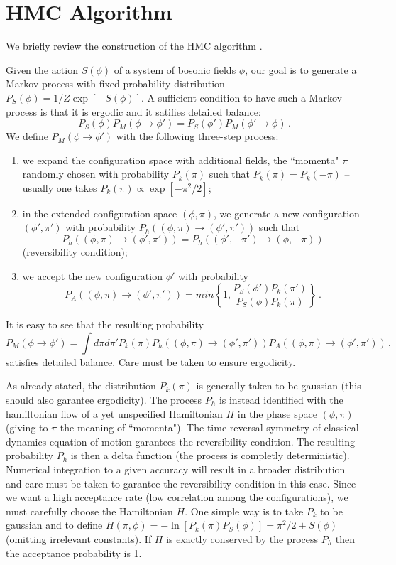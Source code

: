 \documentclass{article}[12pt]
\begin{document}
\section{HMC Algorithm}

We briefly review the construction of the HMC algorithm \cite{??}.

Given the action $S(\phi)$ of a system of bosonic fields $\phi$, our goal is to generate a Markov process with
fixed probability distribution $P_S(\phi) = 1/Z \exp[-S(\phi) ]$. A sufficient condition to have such a
Markov process is that it is ergodic and it satifies detailed balance:
\begin{equation}
P_S(\phi)P_M(\phi\rightarrow \phi') = P_S(\phi')P_M(\phi' \rightarrow \phi) \, .
\end{equation}
We define $P_M(\phi \rightarrow \phi')$ with the following three-step process:
\begin{enumerate}
\item we expand the configuration space with additional fields, the ``momenta" $\pi$ randomly chosen with probability
$P_k(\pi)$ such that $P_k(\pi)=P_k(-\pi)$ -- usually one takes $P_k(\pi)\propto \exp[-\pi^2/2]$;
\item in the extended configuration space $(\phi, \pi)$, we generate a new configuration $(\phi',\pi')$ with probability
$P_h((\phi,\pi)\rightarrow(\phi',\pi'))$ such that
\[P_h((\phi,\pi)\rightarrow(\phi',\pi')) = P_h((\phi',-\pi')\rightarrow(\phi,-\pi))\]
(reversibility condition);
\item we accept the new configuration $\phi'$ with probability
\[P_A((\phi,\pi)\rightarrow(\phi',\pi')) = min \left\{ 1, \frac{P_S(\phi')P_k(\pi')}{P_S(\phi)P_k(\pi)} \right\} \, .\]
\end{enumerate}
It is easy to see that the resulting probability
\begin{equation}
P_M(\phi\rightarrow\phi') = \int d\pi d\pi' P_k(\pi) P_h((\phi,\pi)\rightarrow(\phi',\pi')) P_A((\phi,\pi)\rightarrow(\phi',\pi')) \, ,
\end{equation}
satisfies detailed balance. Care must be taken to ensure ergodicity.

As already stated, the distribution $P_k(\pi)$ is generally taken to be gaussian (this should also garantee ergodicity).
The process $P_h$ is instead identified with the hamiltonian flow of a yet unspecified Hamiltonian $H$ in the phase
space $(\phi,\pi)$ (giving to $\pi$ the meaning of ``momenta"). The time reversal symmetry of classical dynamics equation of motion
garantees the reversibility condition. The resulting probability $P_h$ is then a delta function (the process is completly deterministic).
Numerical integration to a given accuracy will result in a broader distribution and care must be taken to garantee the reversibility condition
in this case.
Since we want a high acceptance rate (low correlation among the configurations), we must carefully choose the Hamiltonian $H$.
One simple way is to take $P_k$ to be gaussian and to define $H(\pi,\phi)=-\ln [P_k(\pi) P_S(\phi)] = \pi^2/2 + S(\phi)$
(omitting irrelevant constants). If $H$ is exactly conserved by the process $P_h$ then the acceptance probability is 1.
\end{document}
